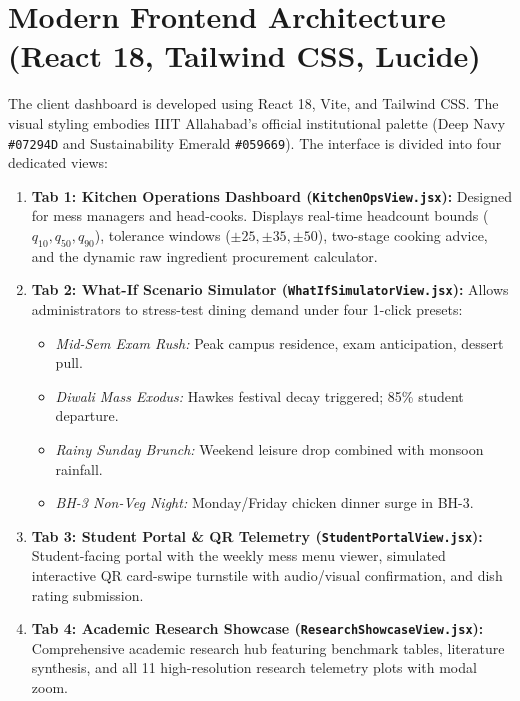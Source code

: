 \documentclass[11pt,a4paper,oneside]{report}
\begin{document}
\section{Modern Frontend Architecture (React 18, Tailwind CSS, Lucide)}
The client dashboard is developed using React 18, Vite, and Tailwind CSS. The visual styling embodies IIIT Allahabad's official institutional palette (Deep Navy \texttt{\#07294D} and Sustainability Emerald \texttt{\#059669}). The interface is divided into four dedicated views:
\begin{enumerate}
  \item \textbf{Tab 1: Kitchen Operations Dashboard (\texttt{KitchenOpsView.jsx}):} Designed for mess managers and head-cooks. Displays real-time headcount bounds ($q_{10}, q_{50}, q_{90}$), tolerance windows ($\pm 25, \pm 35, \pm 50$), two-stage cooking advice, and the dynamic raw ingredient procurement calculator.
  \item \textbf{Tab 2: What-If Scenario Simulator (\texttt{WhatIfSimulatorView.jsx}):} Allows administrators to stress-test dining demand under four 1-click presets:
  \begin{itemize}
    \item \textit{Mid-Sem Exam Rush:} Peak campus residence, exam anticipation, dessert pull.
    \item \textit{Diwali Mass Exodus:} Hawkes festival decay triggered; 85\% student departure.
    \item \textit{Rainy Sunday Brunch:} Weekend leisure drop combined with monsoon rainfall.
    \item \textit{BH-3 Non-Veg Night:} Monday/Friday chicken dinner surge in BH-3.
  \end{itemize}
  \item \textbf{Tab 3: Student Portal \& QR Telemetry (\texttt{StudentPortalView.jsx}):} Student-facing portal with the weekly mess menu viewer, simulated interactive QR card-swipe turnstile with audio/visual confirmation, and dish rating submission.
  \item \textbf{Tab 4: Academic Research Showcase (\texttt{ResearchShowcaseView.jsx}):} Comprehensive academic research hub featuring benchmark tables, literature synthesis, and all 11 high-resolution research telemetry plots with modal zoom.
\end{enumerate}


\end{document}
